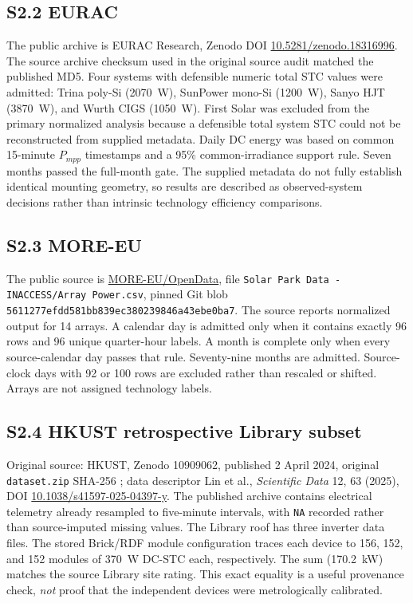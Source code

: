 \documentclass[11pt]{article}
\begin{document}
\subsection*{S2.2 EURAC}
The public archive is EURAC Research, Zenodo DOI \href{https://doi.org/10.5281/zenodo.18316996}{10.5281/zenodo.18316996}. The source archive checksum used in the original source audit matched the published MD5. Four systems with defensible numeric total STC values were admitted: Trina poly-Si (2070~W), SunPower mono-Si (1200~W), Sanyo HJT (3870~W), and Wurth CIGS (1050~W). First Solar was excluded from the primary normalized analysis because a defensible total system STC could not be reconstructed from supplied metadata. Daily DC energy was based on common 15-minute $P_{mpp}$ timestamps and a 95\% common-irradiance support rule. Seven months passed the full-month gate. The supplied metadata do not fully establish identical mounting geometry, so results are described as observed-system decisions rather than intrinsic technology efficiency comparisons.

\subsection*{S2.3 MORE-EU}
The public source is \href{https://github.com/MORE-EU/OpenData}{MORE-EU/OpenData}, file \texttt{Solar Park Data -INACCESS/Array Power.csv}, pinned Git blob \texttt{5611277efdd581bb839ec380239846a43ebe0ba7}. The source reports normalized output for 14 arrays. A calendar day is admitted only when it contains exactly 96 rows and 96 unique quarter-hour labels. A month is complete only when every source-calendar day passes that rule. Seventy-nine months are admitted. Source-clock days with 92 or 100 rows are excluded rather than rescaled or shifted. Arrays are not assigned technology labels.

\subsection*{S2.4 HKUST retrospective Library subset}
Original source: HKUST, Zenodo 10909062, published 2 April 2024, original \texttt{dataset.zip} SHA-256 \texttt{}; data descriptor Lin et al., \emph{Scientific Data} 12, 63 (2025), DOI \href{https://doi.org/10.1038/s41597-025-04397-y}{10.1038/s41597-025-04397-y}. The published archive contains electrical telemetry already resampled to five-minute intervals, with \texttt{NA} recorded rather than source-imputed missing values. The Library roof has three inverter data files. The stored Brick/RDF module configuration traces each device to 156, 152, and 152 modules of 370~W DC-STC each, respectively. The sum (170.2~kW) matches the source Library site rating. This exact equality is a useful provenance check, \emph{not} proof that the independent devices were metrologically calibrated.
\end{document}
